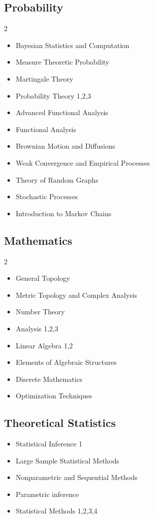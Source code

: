\documentclass[11pt,a4paper]{article}
\begin{document}
\subsection{Probability}
\begin{multicols}{2}
\begin{itemize}[leftmargin=*,noitemsep,topsep=0pt]
  \item Bayesian Statistics and Computation
  \item Measure Theoretic Probability
  \item Martingale Theory
  \item Probability Theory 1,2,3
  \item Advanced Functional Analysis
  \item Functional Analysis
  \item Brownian Motion and Diffusions
  \item Weak Convergence and Empirical Processes
  \item Theory of Random Graphs
  \item Stochastic Processes
  \item Introduction to Markov Chains
\end{itemize}
\end{multicols}

\subsection{Mathematics}
\begin{multicols}{2}
\begin{itemize}[leftmargin=*,noitemsep,topsep=0pt]
  \item General Topology
  \item Metric Topology and Complex Analysis
  \item Number Theory
  \item Analysis 1,2,3
  \item Linear Algebra 1,2
  \item Elements of Algebraic Structures
  \item Discrete Mathematics
  \item Optimization Techniques
\end{itemize}
\end{multicols}

\subsection{Theoretical Statistics}
\begin{itemize}[leftmargin=*,noitemsep,topsep=0pt]
  \item Statistical Inference 1
  \item Large Sample Statistical Methods
  \item Nonparametric and Sequential Methods
  \item Parametric inference
  \item Statistical Methods 1,2,3,4
\end{itemize}
\end{document}
